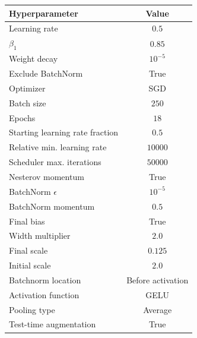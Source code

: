 \begin{tabular}{lc}
\toprule
\textbf{Hyperparameter} & \textbf{Value} \\
\midrule
Learning rate & $0.5$ \\
$\beta_1$ & $0.85$ \\
Weight decay & $10^{-5}$ \\
Exclude BatchNorm & True \\
Optimizer & SGD \\
Batch size & $250$ \\
Epochs & $18$ \\
Starting learning rate fraction & $0.5$ \\
Relative min. learning rate & $10000$ \\
Scheduler max. iterations & $50000$ \\
Nesterov momentum & True \\
BatchNorm $\epsilon$ & $10^{-5}$ \\
BatchNorm momentum & $0.5$ \\
Final bias & True \\
Width multiplier & $2.0$ \\
Final scale & $0.125$ \\
Initial scale & $2.0$ \\
Batchnorm location & Before activation \\
Activation function & GELU \\
Pooling type & Average \\
Test-time augmentation & True \\
\bottomrule
\end{tabular}
